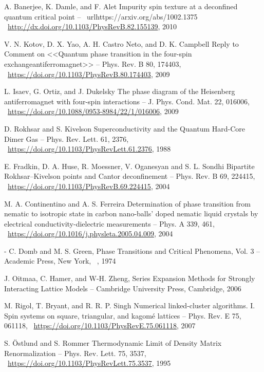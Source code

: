\documentclass[11pt]{article}
\begin{document}
\begin{thebibliography}{3}
A. Banerjee, K. Damle, and F. Alet Impurity spin texture at a deconfined quantum critical point -- ~url{https://arxiv.org/abs/1002.1375} ~\url{http://dx.doi.org/10.1103/PhysRevB.82.155139}, 2010

V. N. Kotov, D. X. Yao, A. H. Castro Neto, and D. K. Campbell Reply to Comment on <<Quantum phase transition in the four-spin exchangeantiferromagnet>> -- Phys. Rev. B 80, 174403,  ~\url{https://doi.org/10.1103/PhysRevB.80.174403}, 2009

L. Isaev, G. Ortiz, and J. Dukelsky The phase diagram of the Heisenberg antiferromagnet with four-spin interactions -- J. Phys. Cond. Mat. 22, 016006,  ~\url{https://doi.org/10.1088/0953-8984/22/1/016006}, 2009

D. Rokhsar and S. Kivelson Superconductivity and the Quantum Hard-Core Dimer Gas -- Phys. Rev. Lett. 61, 2376, ~\url{https://doi.org/10.1103/PhysRevLett.61.2376}, 1988

E. Fradkin, D. A. Huse, R. Moessner, V. Oganesyan and S. L. Sondhi Bipartite Rokhsar–Kivelson points and Cantor deconfinement -- Phys. Rev. B 69, 224415,  ~\url{https://doi.org/10.1103/PhysRevB.69.224415}, 2004

M. A. Continentino and A. S. Ferreira Determination of phase transition from nematic to isotropic state in carbon nano-balls' doped nematic liquid crystals by electrical conductivity-dielectric measurements -- Phys. A 339, 461,  ~\url{https://doi.org/10.1016/j.physleta.2005.04.009}, 2004

-  
C. Domb and M. S. Green, Phase Transitions and Critical Phenomena, Vol. 3 -- Academic Press, New York,  ~\url{}, 1974

J. Oitmaa, C. Hamer, and W-H. Zheng, Series Expansion Methods for Strongly Interacting Lattice Models -- Cambridge University Press, Cambridge, 2006

M. Rigol, T. Bryant, and R. R. P. Singh Numerical linked-cluster algorithms. I. Spin systems on square, triangular, and kagomé lattices -- Phys. Rev. E 75, 061118,  ~\url{https://doi.org/10.1103/PhysRevE.75.061118}, 2007

S. Östlund and S. Rommer Thermodynamic Limit of Density Matrix Renormalization -- Phys. Rev. Lett. 75, 3537,  ~\url{https://doi.org/10.1103/PhysRevLett.75.3537}, 1995


\end{thebibliography}
\end{document}
